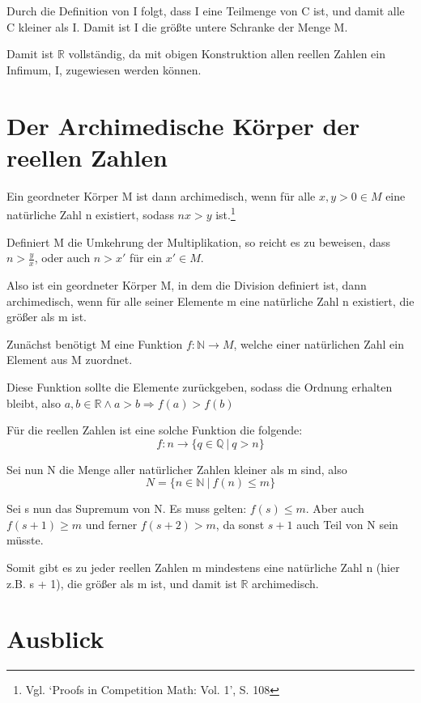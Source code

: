 \documentclass[12pt]{article}
\begin{document}
    Durch die Definition von I folgt, dass I eine Teilmenge von C ist, und damit alle C kleiner als I.
    Damit ist I die größte untere Schranke der Menge M.

    Damit ist $\mathbb{R}$ vollständig, da mit obigen Konstruktion allen reellen Zahlen ein Infimum, I, zugewiesen werden
    können.

    \section{Der Archimedische Körper der reellen Zahlen}

    Ein geordneter Körper M ist dann archimedisch, wenn für alle $x, y > 0 \in M$ eine natürliche Zahl n
    existiert, sodass $nx > y$ ist.\footnote{
        Vgl. `Proofs in Competition Math: Vol. 1', S. 108
    }

    Definiert M die Umkehrung der Multiplikation, so reicht es zu beweisen, dass $n > \frac{y}{x}$, oder
    auch $n > x'$ für ein $x' \in M$.

    Also ist ein geordneter Körper M, in dem die Division definiert ist, dann archimedisch,
    wenn für alle seiner Elemente m eine natürliche Zahl n existiert, die größer als m ist.

    Zunächst benötigt M eine Funktion $f: \mathbb{N} \rightarrow M$,
    welche einer natürlichen Zahl ein Element aus M zuordnet.

    Diese Funktion sollte die Elemente zurückgeben, sodass die Ordnung erhalten bleibt, also
    $a, b \in \mathbb{R} \land a > b \Rightarrow f(a) > f(b)$

    Für die reellen Zahlen ist eine solche Funktion die folgende:
    \[f: n \rightarrow \{q \in \mathbb{Q} \mspace{4mu} | \mspace{4mu} q > n\}\]

    Sei nun N die Menge aller natürlicher Zahlen kleiner als m sind, also
    \[N = \{n \in \mathbb{N} \mspace{4mu} | \mspace{4mu} f(n) \le m\}\]

    Sei s nun das Supremum von N.
    Es muss gelten: $f(s) \le m$.
    Aber auch $f(s+1) \ge m$ und ferner $f(s+2) > m$, da sonst $s+1$ auch Teil von N sein müsste.

    Somit gibt es zu jeder reellen Zahlen m mindestens eine natürliche Zahl n (hier z.B. s + 1), die größer als m ist,
    und  damit ist $\mathbb{R}$ archimedisch.

    \newpage

    \section{Ausblick}
\end{document}
